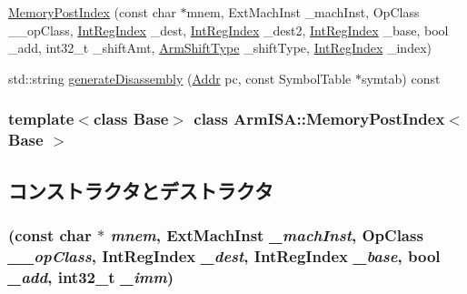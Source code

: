 \begin{DoxyCompactItemize}
\item 
\hyperlink{classArmISA_1_1MemoryPostIndex_ace649d298aca063b81670c1fae087ff6}{MemoryPostIndex} (const char $\ast$mnem, ExtMachInst \_\-machInst, OpClass \_\-\_\-opClass, \hyperlink{namespaceArmISA_ae64680ba9fb526106829d6bf92fc791b}{IntRegIndex} \_\-dest, \hyperlink{namespaceArmISA_ae64680ba9fb526106829d6bf92fc791b}{IntRegIndex} \_\-dest2, \hyperlink{namespaceArmISA_ae64680ba9fb526106829d6bf92fc791b}{IntRegIndex} \_\-base, bool \_\-add, int32\_\-t \_\-shiftAmt, \hyperlink{namespaceArmISA_a209d79feaaef0aa2f54ae62e53ee90de}{ArmShiftType} \_\-shiftType, \hyperlink{namespaceArmISA_ae64680ba9fb526106829d6bf92fc791b}{IntRegIndex} \_\-index)
\item 
std::string \hyperlink{classArmISA_1_1MemoryPostIndex_a95d323a22a5f07e14d6b4c9385a91896}{generateDisassembly} (\hyperlink{classm5_1_1params_1_1Addr}{Addr} pc, const SymbolTable $\ast$symtab) const 
\end{DoxyCompactItemize}
\subsubsection*{template$<$class Base$>$ class ArmISA::MemoryPostIndex$<$ Base $>$}



\subsection{コンストラクタとデストラクタ}
\hypertarget{classArmISA_1_1MemoryPostIndex_a70b63896bd9f4cbd92bdc9951da8a46e}{
\subsubsection[{MemoryPostIndex}]{ (const char $\ast$ {\em mnem}, \/  ExtMachInst {\em \_\-machInst}, \/  OpClass {\em \_\-\_\-opClass}, \/  {\bf IntRegIndex} {\em \_\-dest}, \/  {\bf IntRegIndex} {\em \_\-base}, \/  bool {\em \_\-add}, \/  int32\_\-t {\em \_\-imm})}}
\label{classArmISA_1_1MemoryPostIndex_a70b63896bd9f4cbd92bdc9951da8a46e}



